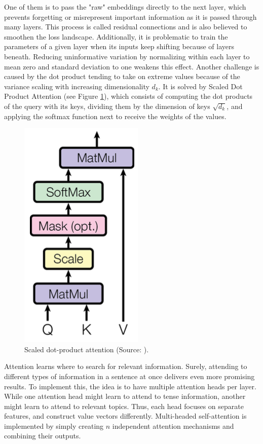 \documentclass[
]{krantz}
\begin{document}
One of them is to pass the "raw" embeddings directly to the next
layer, which prevents forgetting or misrepresent important information
as it is passed through many layers. This process is called residual
connections and is also believed to smoothen the loss landscape.
Additionally, it is problematic to train the parameters of a given layer
when its inputs keep shifting because of layers beneath. Reducing
uninformative variation by normalizing within each layer to mean zero
and standard deviation to one weakens this effect. Another challenge is
caused by the dot product tending to take on extreme values because of
the variance scaling with increasing dimensionality \(d_k\). It is solved
by Scaled Dot Product Attention (see Figure \ref{fig:tfsdpa}), which consists of
computing the dot products of the query with its keys, dividing them by
the dimension of keys \(\sqrt{d_k}\), and applying the softmax function
next to receive the weights of the values.

\begin{figure}

{\centering \includegraphics[width=0.18\linewidth]{./figures/01-01-nlp/transformers_scaled-dot-attention2_vaswani} 

}

\caption{Scaled dot-product attention (Source: \citet{Vaswani2017}).}\label{fig:tfsdpa}
\end{figure}



Attention learns where to search for relevant information. Surely,
attending to different types of information in a sentence at once
delivers even more promising results. To implement this, the idea is to
have multiple attention heads per layer. While one attention head might
learn to attend to tense information, another might learn to attend to
relevant topics. Thus, each head focuses on separate features, and
construct value vectors differently. Multi-headed self-attention is
implemented by simply creating \(n\) independent attention mechanisms and
combining their outputs.
\end{document}
